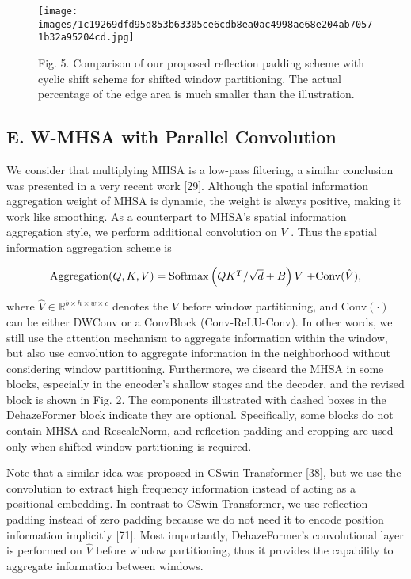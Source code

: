 \documentclass{article}
\begin{document}
\begin{figure}[htbp]
\centering
\texttt{[image: images/1c19269dfd95d853b63305ce6cdb8ea0ac4998ae68e204ab70571b32a95204cd.jpg]}
\caption{Fig. 5. Comparison of our proposed reflection padding scheme with cyclic shift scheme for shifted window partitioning. The actual percentage of the edge area is much smaller than the illustration.}
\end{figure}


\subsection{E. W-MHSA with Parallel Convolution}


We consider that multiplying MHSA is a low-pass filtering, a similar conclusion was presented in a very recent work [29]. Although the spatial information aggregation weight of MHSA is dynamic, the weight is always positive, making it work like smoothing. As a counterpart to MHSA’s spatial information aggregation style, we perform additional convolution on $V$ . Thus the spatial information aggregation scheme is


\[
$$$$\begin{array}{c}{\mathrm{Aggregation}(Q,K,V)=\mathrm{Softmax}\left(Q K^{T}/\sqrt{d}+B\right)V}\ {+\mathrm{Conv}(\hat{V}),}\end{array}
\]


where $\hat{V}\in\mathbb{R}^{b\times h\times w\times c}$ denotes the $V$ before window partitioning, and $\mathrm{Conv}(\cdot)$ can be either DWConv or a ConvBlock (Conv-ReLU-Conv). In other words, we still use the attention mechanism to aggregate information within the window, but also use convolution to aggregate information in the neighborhood without considering window partitioning. Furthermore, we discard the MHSA in some blocks, especially in the encoder’s shallow stages and the decoder, and the revised block is shown in Fig. 2. The components illustrated with dashed boxes in the DehazeFormer block indicate they are optional. Specifically, some blocks do not contain MHSA and RescaleNorm, and reflection padding and cropping are used only when shifted window partitioning is required.


Note that a similar idea was proposed in CSwin Transformer [38], but we use the convolution to extract high frequency information instead of acting as a positional embedding. In contrast to CSwin Transformer, we use reflection padding instead of zero padding because we do not need it to encode position information implicitly [71]. Most importantly, DehazeFormer’s convolutional layer is performed on $\hat{V}$ before window partitioning, thus it provides the capability to aggregate information between windows.
\end{document}
